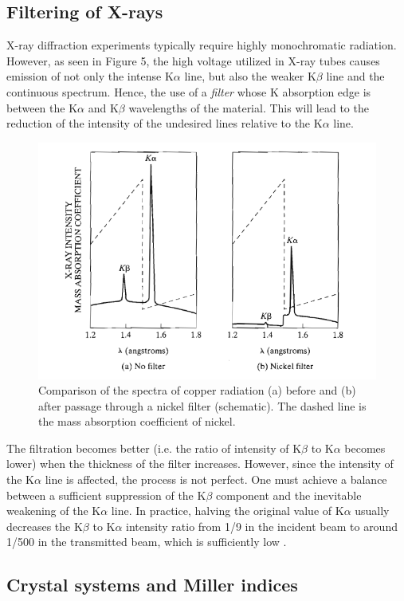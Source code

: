 \documentclass{article}
\begin{document}
\pagebreak{}

\subsection{Filtering of X-rays}
X-ray diffraction experiments typically require highly monochromatic radiation. However, as seen in Figure 5, the high voltage utilized in X-ray tubes causes emission of not only the intense K$\alpha$ line, but also the weaker K$\beta$ line and the continuous spectrum. Hence, the use of a \textit{filter} whose K absorption edge is between the K$\alpha$ and K$\beta$ wavelengths of the material. This will lead to the reduction of the intensity of the undesired lines relative to the K$\alpha$ line. 

\begin{figure}[h]
    \centering
    \includegraphics[width=0.5\linewidth]{Figures/image.png}
    \caption{Comparison of the spectra of copper radiation (a) before and (b) after passage through a nickel filter (schematic). The dashed line is the mass absorption coefficient of nickel. \cite{bernarddeniscullity_2015_elements}}
    \label{fig:enter-label}
\end{figure}

The filtration becomes better (i.e. the ratio of intensity of K$\beta$ to K$\alpha$ becomes lower) when the thickness of the filter increases. However, since the intensity of the K$\alpha$ line is affected, the process is not perfect. One must achieve a balance between a sufficient suppression of the K$\beta$ component and the inevitable weakening of the K$\alpha$ line. In practice, halving the original value of K$\alpha$ usually decreases the K$\beta$ to K$\alpha$ intensity ratio from 1/9 in the incident beam to around 1/500 in the transmitted beam, which is sufficiently low \cite{bernarddeniscullity_2015_elements}. 

\pagebreak{}

\subsection{Crystal systems and Miller indices}
\label{subsection:CrystalSystems}
\end{document}
